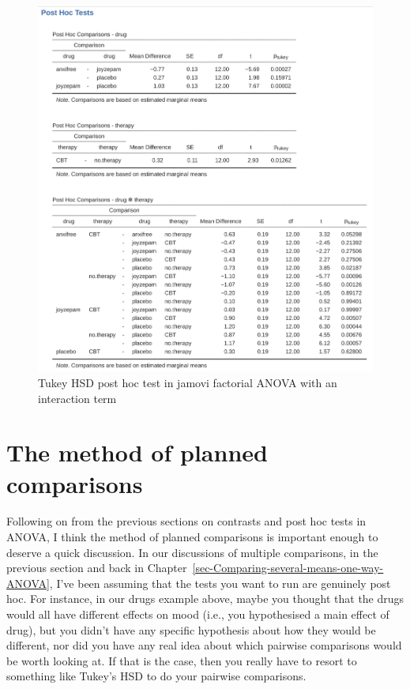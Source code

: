 \documentclass[
  a4paper,
]{book}
\begin{document}
\begin{figure}

\includegraphics[width=1\textwidth,height=\textheight]{images/fig14-25.png} \hfill{}

\caption{\label{fig-fig14-25}Tukey HSD post hoc test in jamovi factorial
ANOVA with an interaction term}

\end{figure}

\hypertarget{sec-The-method-of-planned-comparisons}{%
\section{The method of planned
comparisons}\label{sec-The-method-of-planned-comparisons}}

Following on from the previous sections on contrasts and post hoc tests
in ANOVA, I think the method of planned comparisons is important enough
to deserve a quick discussion. In our discussions of multiple
comparisons, in the previous section and back in
Chapter~\ref{sec-Comparing-several-means-one-way-ANOVA}, I've been
assuming that the tests you want to run are genuinely post hoc. For
instance, in our drugs example above, maybe you thought that the drugs
would all have different effects on mood (i.e., you hypothesised a main
effect of drug), but you didn't have any specific hypothesis about how
they would be different, nor did you have any real idea about which
pairwise comparisons would be worth looking at. If that is the case,
then you really have to resort to something like Tukey's HSD to do your
pairwise comparisons.
\end{document}
